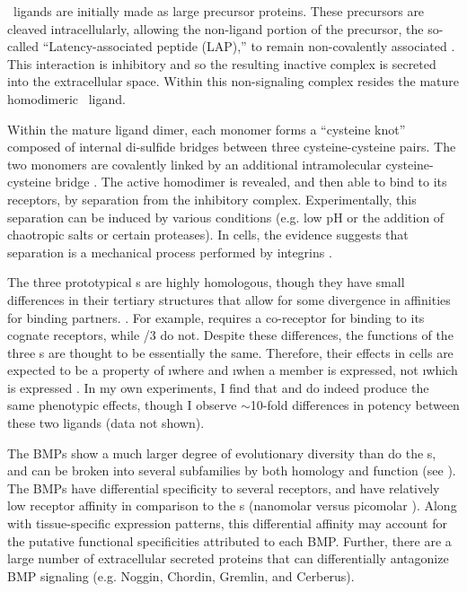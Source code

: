 \tgfbsf\ ligands are initially made as large precursor proteins.
These precursors are cleaved intracellularly,
allowing the non-ligand portion of the precursor, the so-called
``Latency-associated peptide (LAP),'' to remain
non-covalently associated \cite{Khalil1999}. This interaction is inhibitory
and so the resulting inactive complex 
is secreted into the extracellular space.
Within this non-signaling complex resides the mature homodimeric
\tgfbsf\ ligand.


Within the mature ligand dimer, each
monomer forms a ``cysteine knot'' composed of internal
di-sulfide bridges between three cysteine-cysteine pairs.
The two monomers are covalently linked by an additional intramolecular
cysteine-cysteine bridge \cite{Nohe2004,Schmierer2007}.
The active homodimer is revealed, and then able to bind to its receptors, by separation
from the inhibitory complex. Experimentally, this
separation can be induced by various
conditions (e.g. low pH or the addition of chaotropic salts or certain proteases).
In cells, the evidence suggests that
separation is a mechanical process performed by integrins
\cite{Massague1990,Khalil1999,Shi2011}.


The three prototypical \tgf s are highly homologous,
though they have small differences in their
tertiary structures that allow for some divergence in affinities for binding partners.
\cite{Robertson2013}. For example,  requires a co-receptor for binding to
its cognate receptors, while /3 do not.
Despite these differences, the functions of the
three \tgf s are thought to be essentially the same. Therefore,
their effects in cells are expected to be a property of
\i{where} and \i{when} a member
is expressed, not \i{which} is expressed \cite{Radaev2010}.
In my own experiments, I find that
 and  do indeed produce the same phenotypic effects,
though I
observe $\sim$10-fold differences in potency between these two ligands
(data not shown).


The BMPs show a much larger degree of evolutionary diversity
than do the \tgf s, and can be broken into several
subfamilies by both homology and function (see ). The BMPs have
differential specificity to several receptors, and have relatively
low receptor affinity in comparison to the \tgf s (nanomolar
versus picomolar \cite{Ehrlich2011}). Along with tissue-specific 
expression patterns, this differential affinity
may account for the putative functional specificities attributed
to each BMP. Further, there are a large number of extracellular
secreted proteins that can differentially antagonize BMP signaling
(e.g. Noggin, Chordin, Gremlin, and Cerberus).


